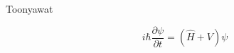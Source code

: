 \documentclass{article}
\begin{document}
Toonyawat

\begin{equation}
i\hbar \frac{\partial \psi}{\partial t} = (\hat{H}+V)\psi
\end{equation}
\end{document}
